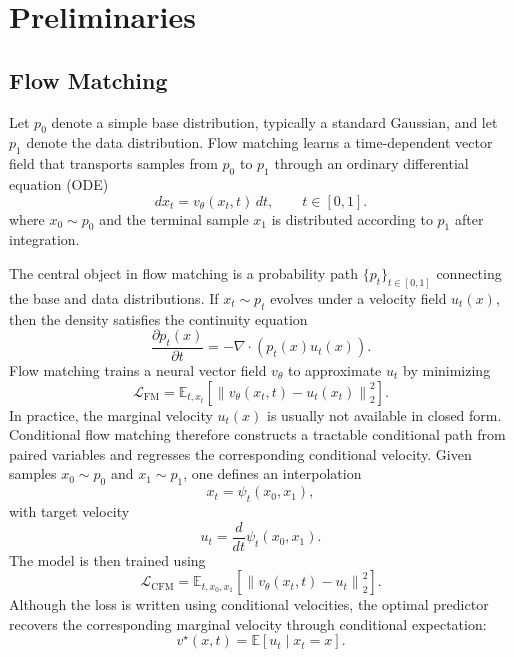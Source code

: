 \documentclass[letterpaper]{article} %
\begin{document}
\section{Preliminaries}

\subsection{Flow Matching}

Let $p_0$ denote a simple base distribution, typically a standard Gaussian, and let $p_1$ denote the data distribution. Flow matching learns a time-dependent vector field that transports samples from $p_0$ to $p_1$ through an ordinary differential equation (ODE)
\begin{equation} 
    d x_t = v_\theta(x_t,t)\,dt, 
    \qquad t\in[0,1]. 
    \label{eq:flow_ode_differential} 
\end{equation}
where $x_0 \sim p_0$ and the terminal sample $x_1$ is distributed according to $p_1$ after integration.

The central object in flow matching is a probability path $\{p_t\}_{t\in[0,1]}$ connecting the base and data distributions. If $x_t \sim p_t$ evolves under a velocity field $u_t(x)$, then the density satisfies the continuity equation
\begin{equation}
    \frac{\partial p_t(x)}{\partial t}
    =
    - \nabla \cdot \left(p_t(x) u_t(x)\right).
    \label{eq:continuity}
\end{equation}
Flow matching trains a neural vector field $v_\theta$ to approximate $u_t$ by minimizing
\begin{equation}
    \mathcal{L}_{\mathrm{FM}}
    =
    \mathbb{E}_{t,x_t}
    \left[
        \left\|
            v_\theta(x_t,t) - u_t(x_t)
        \right\|_2^2
    \right].
    \label{eq:fm_loss}
\end{equation}
In practice, the marginal velocity $u_t(x)$ is usually not available in closed form. Conditional flow matching therefore constructs a tractable conditional path from paired variables and regresses the corresponding conditional velocity. Given samples $x_0 \sim p_0$ and $x_1 \sim p_1$, one defines an interpolation
\begin{equation}
    x_t = \psi_t(x_0,x_1),
    \label{eq:general_path}
\end{equation}
with target velocity
\begin{equation}
    u_t = \frac{d}{dt}\psi_t(x_0,x_1).
    \label{eq:general_velocity}
\end{equation}
The model is then trained using
\begin{equation}
    \mathcal{L}_{\mathrm{CFM}}
    =
    \mathbb{E}_{t,x_0,x_1}
    \left[
        \left\|
            v_\theta(x_t,t) - u_t
        \right\|_2^2
    \right].
    \label{eq:cfm_loss}
\end{equation}
Although the loss is written using conditional velocities, the optimal predictor recovers the corresponding marginal velocity through conditional expectation:
\begin{equation}
    v^\star(x,t)
    =
    \mathbb{E}
    \left[
        u_t
        \mid
        x_t=x
    \right].
    \label{eq:optimal_fm_velocity}
\end{equation}
\end{document}

